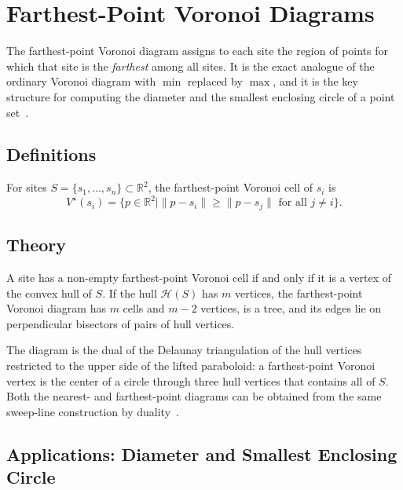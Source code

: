 \section{Farthest-Point Voronoi Diagrams}
\label{sec:farthest_point_voronoi}

The farthest-point Voronoi diagram
assigns to each site the region of points for which that site is the
\emph{farthest} among all sites. It is the exact analogue of the ordinary
Voronoi diagram with $\min$ replaced by $\max$, and it is the key structure for
computing the diameter and the smallest enclosing circle of a point
set~\cite{shamos1975,okabe2000}.

\subsection{Definitions}

\begin{definition}\label{def:farthest_voronoi_cell}
For sites $S = \{s_1, \dots, s_n\} \subset \mathbb{R}^2$, the farthest-point
Voronoi cell of $s_i$ is
\[
V^\star(s_i) = \{p \in \mathbb{R}^2 \mid \|p - s_i\| \ge \|p - s_j\|\text{ for all } j \ne i\}.
\]
\end{definition}

\subsection{Theory}

\begin{theorem}\label{thm:farthest_voronoi_structure}
A site has a non-empty farthest-point Voronoi cell if and only if it is a
vertex of the convex hull of $S$. If the hull $\mathcal{H}(S)$ has $m$
vertices, the farthest-point Voronoi diagram has $m$ cells and $m - 2$
vertices, is a tree, and its edges lie on perpendicular bisectors of pairs of
hull vertices.
\end{theorem}

The diagram is the dual of the Delaunay triangulation of the hull vertices
restricted to the upper side of the lifted paraboloid: a farthest-point
Voronoi vertex is the center of a circle through three hull vertices that
contains all of $S$. Both the nearest- and farthest-point diagrams can be
obtained from the same sweep-line construction by duality~\cite{fortune1987}.

\subsection{Applications: Diameter and Smallest Enclosing Circle}

